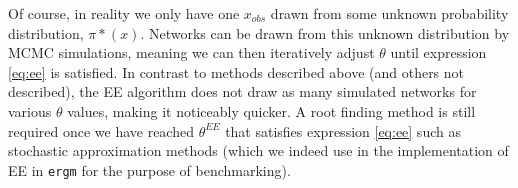 Of course, in reality we only have one $x_{obs}$ drawn from some unknown probability distribution, $\pi*(x)$. Networks can be drawn from this unknown distribution by MCMC simulations, meaning we can then iteratively adjust $\theta$ until expression \ref{eq:ee} is satisfied. In contrast to methods described above (and others not described), the EE algorithm does not draw as many simulated networks for various $\theta$ values, making it noticeably quicker. A root finding method is still required once we have reached $\theta^{EE}$ that satisfies expression \ref{eq:ee} such as stochastic approximation methods (which we indeed use in the implementation of EE in \texttt{ergm} for the purpose of benchmarking).



